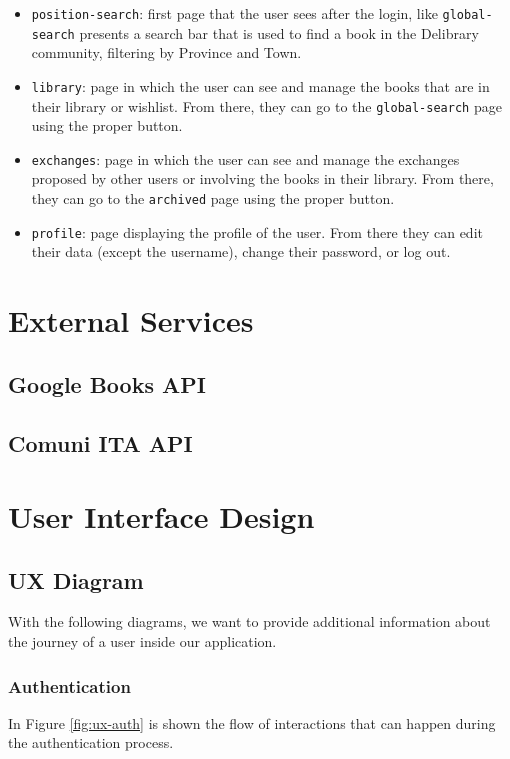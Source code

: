 \begin{itemize}
      \item \texttt{position-search}:
            first page that the user sees after the login, like \texttt{global-search} presents a search bar that is used to find a book
            in the Delibrary community, filtering by Province and Town.
      \item \texttt{library}:
            page in which the user can see and manage the books that are in their library or wishlist.
            From there, they can go to the \texttt{global-search} page using the proper button.
      \item \texttt{exchanges}:
            page in which the user can see and manage the exchanges proposed by other users or involving the books in their library.
            From there, they can go to the \texttt{archived} page using the proper button.
      \item \texttt{profile}:
            page displaying the profile of the user. From there they can edit their data (except the username), change their password, or log out.
\end{itemize}

\chapter{External Services}

\section{Google Books API}

\section{Comuni ITA API}



\chapter{User Interface Design}

\section{UX Diagram}
With the following diagrams, we want to provide additional information about the journey of a user inside our application.

\subsection{Authentication}
In Figure \ref{fig:ux-auth} is shown the flow of interactions that can happen during the authentication process.

